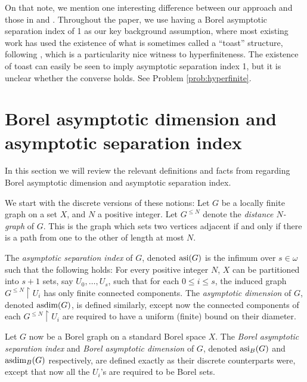 \documentclass[12pt]{article}
\newcommand{\0}{\varnothing}
\newcommand{\asdim}{\textnormal{asdim}}
\newcommand{\asi}{\textnormal{asi}}
\newcommand{\res}{\upharpoonright}
\begin{document}
On that note, we mention one interesting difference between our approach and those in \cite{GR} and \cite{BHT}. Throughout the paper, we use having a Borel asymptotic separation index of 1 as our key background assumption, where most existing work has used the existence of what is sometimes called a ``toast'' structure, following \cite{toast}, which is a particularity nice witness to hyperfiniteness. The existence of toast can easily be seen to imply asymptotic separation index 1, but it is unclear whether the converse holds. See Problem \ref{prob:hyperfinite}.


\section{Borel asymptotic dimension and asymptotic separation index}\label{sec:dim}


In this section we will review the relevant definitions and facts from \cite{dim} regarding Borel asymptotic dimension and asymptotic separation index. 

We start with the discrete versions of these notions: Let $G$ be a locally finite graph on a set $X$, and $N$ a positive integer. Let $G^{\leq N}$ denote the \textit{distance $N$-graph} of $G$. This is the graph which sets two vertices adjacent if and only if there is a path from one to the other of length at most $N$.

The \textit{asymptotic separation index} of $G$, denoted $\asi(G)$ is the infimum over $s \in \omega$ such that the following holds: For every positive integer $N$, $X$ can be partitioned into $s+1$ sets, say $U_0,\ldots,U_s$, such that for each $0 \leq i \leq s$, the induced graph $G^{\leq N} \res U_i$ has only finite connected components. The \textit{asymptotic dimension} of $G$, denoted $\asdim(G)$, is defined similarly, except now the connected components of each $G^{\leq N} \res U_i$ are required to have a uniform (finite) bound on their diameter. 

 Let $G$ now be a Borel graph on a standard Borel space $X$. The \textit{Borel asymptotic separation index} and \textit{Borel asymptotic dimension} of $G$, denoted $\asi_B(G)$ and $\asdim_B(G)$ respectively, are defined exactly as their discrete counterparts were, except that now all the $U_i$'s are required to be Borel sets.
 
\end{document}
